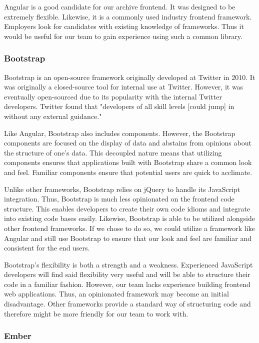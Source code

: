 \documentclass[12pt]{report}
\begin{document}
Angular is a good candidate for our archive frontend. It was designed to be extremely flexible. Likewise, it is a commonly used industry frontend framework. Employers look for candidates with existing knowledge of frameworks. Thus it would be useful for our team to gain experience using such a common library.

\subsubsection*{Bootstrap}

Bootstrap is an open-source framework originally developed at Twitter in 2010.\cite{bootstrapabout} It was originally a closed-source tool for internal use at Twitter. However, it was eventually open-sourced due to its popularity with the internal Twitter developers. Twitter found that "developers of all skill levels [could jump] in without any external guidance."\cite{bootstrapabout}

Like Angular, Bootstrap also includes components. However, the Bootstrap components are focused on the display of data and abstains from opinions about the structure of one's data. This decoupled nature means that utilizing components ensures that applications built with Bootstrap share a common look and feel. Familiar components ensure that potential users are quick to acclimate.

Unlike other frameworks, Bootstrap relies on jQuery to handle its JavaScript integration.\cite{bootstrapjs} Thus, Bootstrap is much less opinionated on the frontend code structure. This enables developers to create their own code idioms and integrate into existing code bases easily. Likewise, Bootstrap is able to be utilized alongside other frontend frameworks. If we chose to do so, we could utilize a framework like Angular and still use Bootstrap to ensure that our look and feel are familiar and consistent for the end users.

Bootstrap's flexibility is both a strength and a weakness. Experienced JavaScript developers will find said flexibility very useful and will be able to structure their code in a familiar fashion. However, our team lacks experience building frontend web applications. Thus, an opinionated framework may become an initial disadvantage. Other frameworks provide a standard way of structuring code and therefore might be more friendly for our team to work with.

\subsubsection*{Ember}
\end{document}
